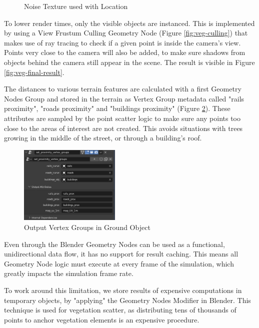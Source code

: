 \begin{figure}[!htb]
\begin{minipage}{0.53\textwidth}
     \caption{Noise Texture used with Location}
     \label{fig:veg-noise}
   \end{minipage}
\end{figure}

To lower render times, only the visible objects are instanced. This is implemented by using a View Frustum Culling Geometry Node (Figure \ref{fig:veg-culling}) that makes use of ray tracing to check if a given point is inside the camera's view.  Points very close to the camera will also be added, to make sure shadows from objects behind the camera still appear in the scene. The result is visible in Figure \ref{fig:veg-final-result}.

The distances to various terrain features are calculated with a first Geometry Nodes Group and stored in the terrain as Vertex Group metadata called "rails proximity", "roads proximity" and "buildings proximity" (Figure \ref{fig:veg-ground-vertex-groups}). These attributes are sampled by the point scatter logic to make sure any points too close to the areas of interest are not created. This avoids situations with trees growing in the middle of the street, or through a building's roof.

\begin{figure}
    \centering
    \includegraphics[width=0.43\textwidth]{src/img/vegetation/1-ground-vertex-groups.jpg}
     \caption{Output Vertex Groups in Ground Object}
     \label{fig:veg-ground-vertex-groups}
\end{figure}

Even through the Blender Geometry Nodes can be used as a functional, unidirectional data flow, it has no support for result caching. This means all Geometry Node logic must execute at every frame of the simulation, which greatly impacts the simulation frame rate.

To work around this limitation, we store results of expensive computations in temporary objects, by "applying" the Geometry Nodes Modifier in Blender. This technique is used for vegetation scatter, as distributing tens of thousands of points to anchor vegetation elements is an expensive procedure.

